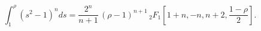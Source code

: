 \begin{equation}
\int_1^{\rho} (s^2-1)^n ds=\frac{2^n}{n+1}\,(\rho-1)^{n+1}\,
_2F_{1}[1+n,-n,n+2,\frac{1-\rho}{2}]. \label{nice}
\end{equation}

